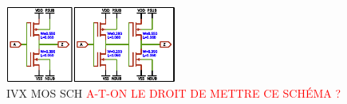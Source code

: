 
\begin{figure}[h]
	\label{ivxbufmos}
	\centering
	\includegraphics[width=0.5\textwidth]{./figures/IVX_BUFF_X4_3.pdf}
	\caption{IVX MOS SCH \textcolor{red}{A-T-ON LE DROIT DE METTRE CE SCHÉMA ?}}
\end{figure}
